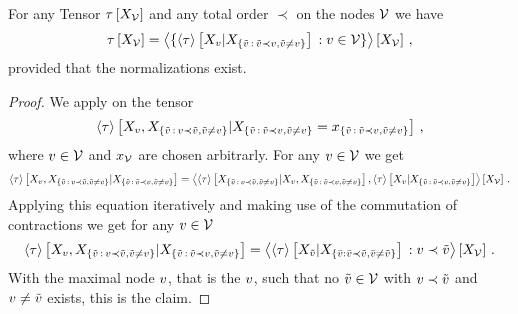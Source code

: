 \begin{theorem}
    \label{the:genericChainRule}
    For any Tensor $\tau\left[X_{\mathcal{V}}\right]$ and any total order $\prec$ on the nodes $\mathcal{V}$ we have %
    \begin{align*}
        \tau\left[X_{\mathcal{V}}\right] =
        \left\langle 
            \{\left\langle \tau\right\rangle \left[ X_{v} | X_{\{\tilde{v} \, : \, \tilde{v} \prec v, \tilde{v}\neq v\}} \right]  \, : v\in\mathcal{V} \}
        \right\rangle \left[ X_{\mathcal{V}} \right] \, ,
    \end{align*}
    provided that the normalizations exist.
\end{theorem}
\begin{proof}
    We apply  on the tensor
    \begin{align*}
        \left\langle \tau\right\rangle \left[ 
            X_{v},X_{\{\tilde{v} \, : \, v \prec \tilde{v}, \tilde{v}\neq v\}}
         | 
            X_{\{\tilde{v} \, : \, \tilde{v} \prec v, \tilde{v}\neq v\}}=x_{\{\tilde{v} \, : \, \tilde{v} \prec v, \tilde{v}\neq v\}}
         \right] \, ,
    \end{align*}
    where $v\in\mathcal{V}$ and $x_{\mathcal{V}}$ are chosen arbitrarly.
    For any $v\in\mathcal{V}$ we get
    \begin{align*}
        \left\langle \tau\right\rangle \left[ 
            X_{v},X_{\{\tilde{v} \, : \, v \prec \tilde{v}, \tilde{v}\neq v\}}
         | 
            X_{\{\tilde{v} \, : \, \tilde{v} \prec v, \tilde{v}\neq v\}}
         \right]
        = \left\langle 
            \left\langle \tau\right\rangle \left[ 
                X_{\{\tilde{v} \, : \, v \prec \tilde{v}, \tilde{v}\neq v\}}
             | 
                X_{v},X_{\{\tilde{v} \, : \, \tilde{v} \prec v, \tilde{v}\neq v\}}
             \right],
            \left\langle \tau\right\rangle \left[ 
                X_{v}
             | 
                X_{\{\tilde{v} \, : \, \tilde{v} \prec v, \tilde{v}\neq v\}}
             \right]
        \right\rangle \left[ 
            X_{\mathcal{V}}
         \right] \, .
    \end{align*}
    Applying this equation iteratively and making use of the commutation of contractions we get for any $v\in\mathcal{V}$
    \begin{align*}
        \left\langle \tau\right\rangle \left[ 
            X_{v},X_{\{\tilde{v} \, : \, v \prec \tilde{v}, \tilde{v}\neq v\}}
         | 
            X_{\{\tilde{v} \, : \, \tilde{v} \prec v, \tilde{v}\neq v\}}
         \right]
        = \left\langle 
            \left\langle \tau\right\rangle \left[ 
                X_{\tilde{v}}
             | 
                X_{\{\bar{v} : \bar{v} \prec \tilde{v}, \bar{v}\neq\tilde{v}\}}
             \right]
            \, : v \prec \tilde{v}
        \right\rangle \left[ 
            X_{\mathcal{V}}
         \right] \, .
    \end{align*}
    With the maximal node $v$, that is the $v$, such that no $\tilde{v}\in\mathcal{V}$ with $v\prec\tilde{v}$ and $v\neq\tilde{v}$ exists, this is the claim.
\end{proof}


